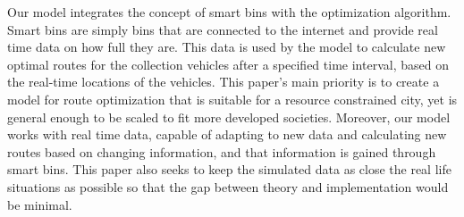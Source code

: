\documentclass[12pt]{article}
\begin{document}



Our model integrates the concept of smart bins with the optimization algorithm. Smart bins are simply bins that are connected to the internet and provide real time data on how full they are. This data is used by the model to calculate new optimal routes for the collection vehicles after a specified time interval, based on the real-time locations of the vehicles. This paper's main priority is to create a model for route optimization that is suitable for a resource constrained city, yet is general enough to be scaled to fit more developed societies. Moreover, our model works with real time data, capable of adapting to new data and calculating new routes based on changing information, and that information is gained through smart bins. This paper also seeks to keep the simulated data as close the real life situations as possible so that the gap between theory and implementation would be minimal.
\end{document}
